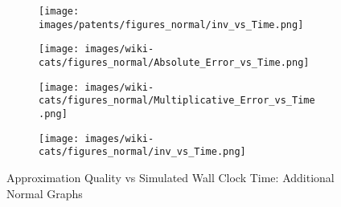 \begin{figure*}[htbp]
\begin{subfigure}[b]{\textwidth}
\begin{minipage}[b]{0.3\textwidth}
			\texttt{[image: images/patents/figures\_normal/inv\_vs\_Time.png]} %
		\end{minipage}
		
	\end{subfigure}
	\begin{subfigure}[b]{\textwidth}
		\centering
		\begin{minipage}[b]{0.05\textwidth}
			\centering
		\end{minipage}%
		\begin{minipage}[b]{0.3\textwidth}
			\centering
			\texttt{[image: images/wiki-cats/figures\_normal/Absolute\_Error\_vs\_Time.png]} %
			
		\end{minipage}%
		\begin{minipage}[b]{0.3\textwidth}
			\centering
			
			\texttt{[image: images/wiki-cats/figures\_normal/Multiplicative\_Error\_vs\_Time.png]} %
			
		\end{minipage}%
		\begin{minipage}[b]{0.3\textwidth}
			\centering
			
			\texttt{[image: images/wiki-cats/figures\_normal/inv\_vs\_Time.png]} %
		\end{minipage}
	\end{subfigure}
	\caption{Approximation Quality vs Simulated Wall Clock Time: Additional Normal Graphs}
	\label{fig:accuracy_time_normal_graphs_2}
\end{figure*}


